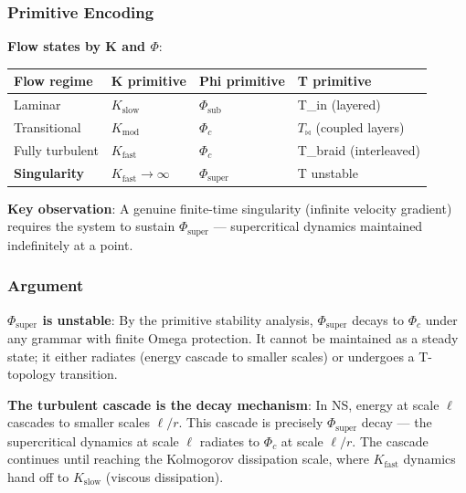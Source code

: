 \documentclass[12pt,a4paper]{article}
\begin{document}
\subsubsection{Primitive Encoding}

\textbf{Flow states by K and $\Phi$}:

\begin{table}[htbp]
\centering
\small
{}
\begin{tabularx}{\textwidth}{>{\centering\arraybackslash}X >{\centering\arraybackslash}X >{\centering\arraybackslash}X >{\centering\arraybackslash}X}
\toprule
\rowcolor{gray!25}\textbf{Flow regime} & \textbf{K primitive} & \textbf{Phi primitive} & \textbf{T primitive} \\
\midrule
\rowcolors{1}{white}{gray!10}
Laminar & $K_{\text{slow}}$ & $\Phi_{\text{sub}}$ & T\_in (layered) \\
Transitional & $K_{\text{mod}}$ & $\Phi_c$ & $T_{\bowtie}$ (coupled layers) \\
Fully turbulent & $K_{\text{fast}}$ & $\Phi_c$ & T\_braid (interleaved) \\
\textbf{Singularity} & $K_{\text{fast}} \to \infty$ & \textbf{$\Phi_{\text{super}}$} & T unstable \\
\bottomrule
\end{tabularx}
\end{table}

\textbf{Key observation}: A genuine finite-time singularity (infinite velocity gradient) requires the system to sustain $\Phi_{\text{super}}$ --- supercritical dynamics maintained indefinitely at a point.

\subsubsection{Argument}

\textbf{$\Phi_{\text{super}}$ is unstable}: By the primitive stability analysis, $\Phi_{\text{super}}$ decays to $\Phi_c$ under any grammar with finite Omega protection. It cannot be maintained as a steady state; it either radiates (energy cascade to smaller scales) or undergoes a T-topology transition.

\textbf{The turbulent cascade is the decay mechanism}: In NS, energy at scale $\ell$ cascades to smaller scales $\ell/r$. This cascade is precisely $\Phi_{\text{super}}$ decay --- the supercritical dynamics at scale $\ell$ radiates to $\Phi_c$ at scale $\ell/r$. The cascade continues until reaching the Kolmogorov dissipation scale, where $K_{\text{fast}}$ dynamics hand off to $K_{\text{slow}}$ (viscous dissipation).
\end{document}

